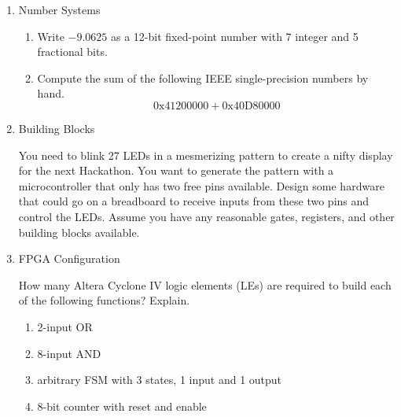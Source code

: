 \documentclass{e85}
\date{2019}
\author{}
\begin{document}
\begin{enumerate}
\item Number Systems
  \begin{enumerate}
  \item Write \(-9.0625\) as a 12-bit fixed-point number with 7
    integer and 5 fractional bits.
    \begin{solution}
    \end{solution}
  \item Compute the sum of the following IEEE single-precision numbers
    by hand.
    \[
      \mathrm{0x41200000} + \mathrm{0x40D80000}
    \]
    \begin{solution}
    \end{solution}
  \end{enumerate}

\item Building Blocks

  You need to blink 27 LEDs in a mesmerizing pattern to create a nifty
  display for the next Hackathon.  You want to generate the pattern
  with a microcontroller that only has two free pins available.
  Design some hardware that could go on a breadboard to receive inputs
  from these two pins and control the LEDs.  Assume you have any
  reasonable gates, registers, and other building blocks available.
  \begin{solution}
  \end{solution}

\item FPGA Configuration

  How many Altera Cyclone IV logic elements (LEs) are required to
  build each of the following functions?  Explain.
  \begin{enumerate}
  \item 2-input OR
    \begin{solution}
    \end{solution}
  \item 8-input AND
    \begin{solution}
    \end{solution}
  \item arbitrary FSM with 3 states, 1 input and 1 output
    \begin{solution}
    \end{solution}
  \item 8-bit counter with reset and enable
    \begin{solution}
    \end{solution}
  \end{enumerate}


\end{enumerate}
\end{document}
